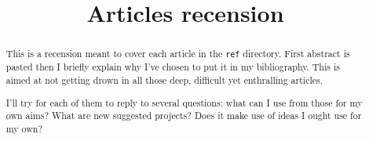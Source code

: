 \documentclass[12pt,onecolumn]{article} %
\title{Articles recension}
\author{}
\begin{document}
\maketitle
{}
\begin{abstract}
\par This is a recension meant to cover each article in the \texttt{ref} directory. First abstract is pasted then I briefly explain why I've chosen to put it in my bibliography. This is aimed at not getting drown in all those deep, difficult yet enthralling articles.\par I'll try for each of them to reply to several questions: what can I use from those for my own aims? What are new suggested projects? Does it make use of ideas I ought use for my own?
\end{abstract}
\tableofcontents

\cleardoublepage
\section{}

\cleardoublepage
\nocite{*}
\printbibliography[title={Bibliographie}, keyword={read}, heading=bibliography] %
\printbibheading[title={Références à traiter},heading=bibliography]
\printbibliography[title={A télécharger\footnote{Articles et documents auxquels je n'ai pas pu accéder.}}, keyword={wanted}, notkeyword={read}, heading=subbibliography]
\printbibliography[title={A lire\footnote{En d'autres termes : \textsc{taf}}}, notkeyword={wanted}, notkeyword={read}, heading=subbibliography]
\end{document}
